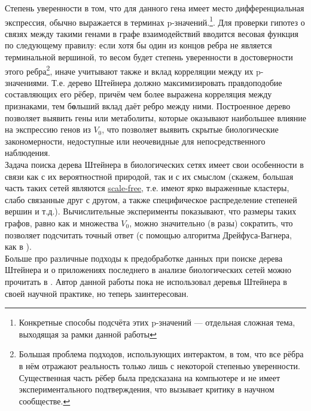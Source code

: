 \documentclass[11pt,a4paper]{report}
\theoremstyle{definition}
\theoremstyle{definition}
\theoremstyle{definition}
\begin{document}
	\noindent Степень уверенности в том, что для данного гена имеет место дифференциальная экспрессия, обычно выражается в терминах p-значений.\footnote{Конкретные способы подсчёта этих p-значений — отдельная сложная тема, выходящая за рамки данной работы}. Для проверки гипотез о связях между такими генами в графе взаимодействий вводится весовая функция по следующему правилу: если хотя бы один из концов ребра не является терминальной вершиной, то весом будет степень уверенности в достоверности этого ребра\footnote{Большая проблема подходов, использующих интерактом, в том, что все рёбра в нём отражают реальность только лишь с некоторой степенью уверенности. Существенная часть рёбер была предсказана на компьютере и не имеет экспериментального подтверждения, что вызывает критику в научном сообществе.}, иначе учитывают также и вклад корреляции между их p-значениями. Т.е. дерево Штейнера должно максимизировать правдоподобие составляющих его рёбер, причём чем более выражена корреляция между признаками, тем б\textbf{о}льший вклад даёт ребро между ними. Построенное дерево позволяет выявить гены или метаболиты, которые оказывают наибольшее влияние на экспрессию генов из $V_0$, что позволяет выявить скрытые биологические закономерности, недоступные или неочевидные для непосредственного наблюдения.\\
	
	\noindent Задача поиска дерева Штейнера в биологических сетях имеет свои особенности в связи как с их вероятностной природой, так и с их смыслом (скажем, большая часть таких сетей являются \href{https://en.wikipedia.org/wiki/Scale-free_network}{scale-free}, т.е. имеют ярко выраженные кластеры, слабо связанные друг с другом, а также специфическое распределение степеней вершин и т.д.). Вычислительные эксперименты \cite{UniTubingen} показывают, что размеры таких графов, равно как и множества $V_0$, можно значительно (в разы) сократить, что позволяет подсчитать точный ответ (с помощью алгоритма Дрейфуса-Вагнера, как в \cite{UniTubingen}).\\
	
	\noindent Больше про различные подходы к предобработке данных при поиске дерева Штейнера и о приложениях последнего в анализе биологических сетей можно прочитать в \cite{UniTubingen}. Автор данной работы пока не использовал деревья Штейнера в своей научной практике, но теперь заинтересован.
\end{document}
